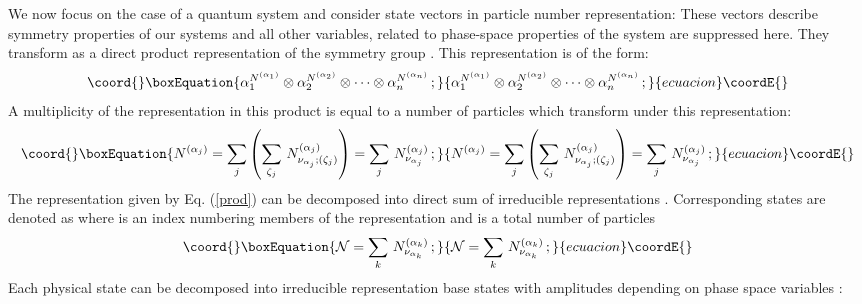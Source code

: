 \documentclass[a4paper,11pt]{article}
\begin{document}
We now focus on the case of a quantum system and consider state
vectors in particle number representation: \coordHE{} These vectors
describe symmetry properties of our systems and all other
variables, related to phase-space properties of the system are
suppressed here. They transform as a direct product representation
of the symmetry group \coordHE{}. This representation is of the form:
\begin{equation}\coord{}\boxEquation{
\alpha_1^{N^{(\alpha_1)}} \otimes \alpha_2^{N^{(\alpha_2)}}
\otimes \cdots \otimes \alpha_n^{N^{(\alpha_n)}}\,; \label{prod}
}{
\alpha_1^{N^{(\alpha_1)}} \otimes \alpha_2^{N^{(\alpha_2)}}
\otimes \cdots \otimes \alpha_n^{N^{(\alpha_n)}}\,; }{ecuacion}\coordE{}\end{equation}
A multiplicity \coordHE{} of the representation \coordHE{}
in this product is equal to a number of particles which transform
under this representation:
\begin{equation}\coord{}\boxEquation{
N^{(\alpha_j)} = \sum_j\left(\sum_{\zeta_j}\,
N^{(\alpha_j)}_{\nu_{\alpha_j};(\zeta_j)}\right)= \sum_j\,
N^{(\alpha_j)}_{\nu_{\alpha_j}}\,; \label{pnumber}
}{
N^{(\alpha_j)} = \sum_j\left(\sum_{\zeta_j}\,
N^{(\alpha_j)}_{\nu_{\alpha_j};(\zeta_j)}\right)= \sum_j\,
N^{(\alpha_j)}_{\nu_{\alpha_j}}\,; }{ecuacion}\coordE{}\end{equation}
The representation given by Eq. (\ref{prod}) can be decomposed
into direct sum of irreducible representations \coordHE{}.
Corresponding states are denoted as \coordHE{} where
\coordHE{} is an index numbering members of the
representation \myHighlight{$\Lambda$}\coordHE{} and \coordHE{} is a total number of
particles
\begin{equation}\coord{}\boxEquation{
{\cal N}=\sum_k\, N^{(\alpha_k)}_{\nu_{\alpha_k}}\,;\label{number}
}{
{\cal N}=\sum_k\, N^{(\alpha_k)}_{\nu_{\alpha_k}}\,;}{ecuacion}\coordE{}\end{equation}
Each physical state can be decomposed into irreducible
representation base states with amplitudes depending on phase
space variables \myHighlight{$\Gamma$}\coordHE{}:
\end{document}
